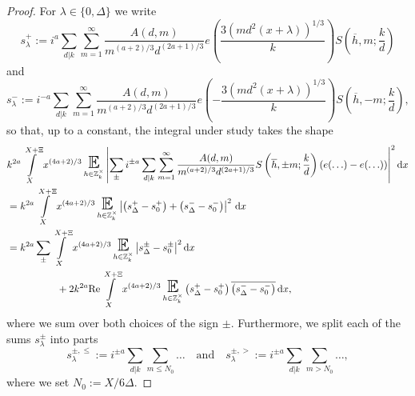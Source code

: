 \documentclass[a4paper,10pt,twoside]{amsart}
\theoremstyle{definition}
\numberwithin{equation}{section}
\newcommand\E{\mathbb{E}}
\renewcommand{\Re}{\textnormal{Re}}
\renewcommand{\Im}{\textnormal{Im}}
\renewcommand\:{\colon}
\begin{document}
\begin{proof}
For $\lambda\in\{0,\Delta\}$ we write
\[s_\lambda^+:=i^a\sum_{d|k}\sum_{m=1}^\infty\frac{A(d,m)}{m^{(a+2)/3}d^{(2a+1)/3}}e\!\left(\frac{3(md^2(x+\lambda))^{1/3}}k\right)S\left(\overline h,m;\frac kd\right)\]and\[
s_\lambda^-:=i^{-a}\sum_{d|k}\sum_{m=1}^\infty\frac{A(d,m)}{m^{(a+2)/3}d^{(2a+1)/3}}e\!\left(-\frac{3(md^2(x+\lambda))^{1/3}}k\right)S\left(\overline h,-m;\frac kd\right),\]
so that, up to a constant, the integral under study takes the shape
\begin{align}\label{Expanding-the-integral}
&k^{2a}\int\limits_X^{X+\Xi}x^{(4a+2)/3}\mathop{\text{\LARGE$\E$}}_{h\in\mathbb Z_k^\times}\left|\sum_\pm i^{\pm a}\sum_{d|k}\sum_{m=1}^\infty\frac{A(d,m)}{m^{(a+2)/3}d^{(2a+1)/3}}S\left(\overline h,\pm m;\frac kd\right)\left(e\!\left(\ldots\right)-e\!\left(\ldots\right)\right)\right|^2\mathrm dx \nonumber\\
&=k^{2a}\int\limits_X^{X+\Xi}x^{(4a+2)/3}\mathop{\text{\LARGE$\E$}}_{h\in\mathbb Z_k^\times}\left|\left(s_\Delta^+-s_0^+\right)+\left(s_\Delta^--s_0^-\right)\right|^2\,\mathrm d x \nonumber\\
&= k^{2a}\sum_{\pm}\int\limits_X^{X+\Xi}x^{(4a+2)/3}\mathop{\text{\LARGE$\E$}}_{h\in\mathbb Z_k^\times}\left|s_\Delta^\pm-s_0^\pm\right|^2\mathrm dx \nonumber \\&\qquad\qquad\quad+2k^{2a}\Re\int\limits_X^{X+\Xi}x^{(4a+2)/3}\mathop{\text{\LARGE$\E$}}_{h\in\mathbb Z_k^\times}\left(s_\Delta^+-s_0^+\right)\overline{\left(s_\Delta^--s_0^-\right)}\,\mathrm d x,
\end{align}
where we sum over both choices of the sign $\pm$. Furthermore, we split each of the sums $s_\lambda^\pm$ into parts
\[s_\lambda^{\pm,\leqslant}:=i^{\pm a}\sum_{d|k}\sum_{m\leqslant N_0}\ldots\quad\text{and}\quad
s_\lambda^{\pm,>}:=i^{\pm a}\sum_{d|k}\sum_{m>N_0}\ldots,\]
where we set $N_0:=X/6\Delta$.%


\end{proof}
\end{document}
